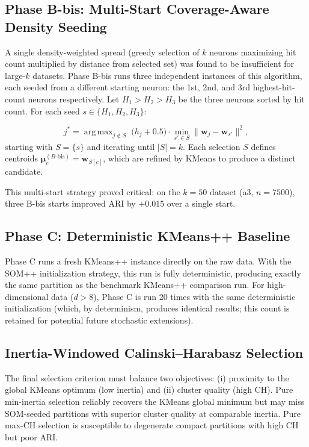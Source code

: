 \documentclass[journal]{IEEEtran}
\DeclareMathOperator*{\argmax}{arg\,max}
\begin{document}
\subsection{Phase B-bis: Multi-Start Coverage-Aware Density Seeding}

A single density-weighted spread (greedy selection of $k$ neurons maximizing hit count multiplied by distance from selected set) was found to be insufficient for large-$k$ datasets. Phase B-bis runs three independent instances of this algorithm, each seeded from a different starting neuron: the 1st, 2nd, and 3rd highest-hit-count neurons respectively. Let $H_1 > H_2 > H_3$ be the three neurons sorted by hit count. For each seed $s \in \{H_1, H_2, H_3\}$:

\begin{equation}
  j^* = \argmax_{j \notin S} \;\bigl(h_j + 0.5\bigr) \cdot \min_{s' \in S} \|\mathbf{w}_j - \mathbf{w}_{s'}\|^2,
\end{equation}
starting with $S = \{s\}$ and iterating until $|S| = k$. Each selection $S$ defines centroids $\boldsymbol{\mu}_c^{(B\text{-bis})} = \mathbf{w}_{S[c]}$, which are refined by KMeans to produce a distinct candidate.

This multi-start strategy proved critical: on the $k=50$ dataset (a3, $n=7500$), three B-bis starts improved ARI by $+0.015$ over a single start.

\subsection{Phase C: Deterministic KMeans++ Baseline}

Phase C runs a fresh KMeans++ instance directly on the raw data. With the SOM++ initialization strategy, this run is fully deterministic, producing exactly the same partition as the benchmark KMeans++ comparison run. For high-dimensional data ($d > 8$), Phase C is run 20 times with the same deterministic initialization (which, by determinism, produces identical results; this count is retained for potential future stochastic extensions).

\subsection{Inertia-Windowed Calinski--Harabasz Selection}

The final selection criterion must balance two objectives: (i) proximity to the global KMeans optimum (low inertia) and (ii) cluster quality (high CH). Pure min-inertia selection reliably recovers the KMeans global minimum but may miss SOM-seeded partitions with superior cluster quality at comparable inertia. Pure max-CH selection is susceptible to degenerate compact partitions with high CH but poor ARI.
\end{document}
